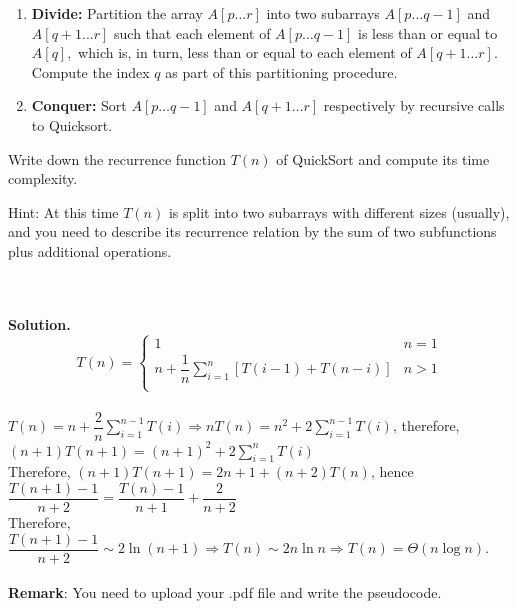 \documentclass{article}
\newtheorem*{solution}{Solution}
\renewenvironment{solution}[1][Solution]{~\\ \textbf{#1.}}{~\\}
\begin{document}
\begin{enumerate}
\begin{enumerate}
    	\item
    	\textbf{Divide:} Partition the array $A[p \ldots r]$ into two subarrays $A[p \ldots q-1]$ and $A[q+1 \ldots r]$ such that each element of $A[p \ldots q-1]$ is less than or equal to $A[q],$ which is, in turn, less than or equal to each element of $A[q+1 \ldots r].$ Compute the index $q$ as part of this partitioning procedure.
    	
    	\item
    	\textbf{Conquer:} Sort $A[p \ldots q-1]$ and $A[q+1 \ldots r]$ respectively by recursive calls to Quicksort.
    	
    \end{enumerate}
    Write down the recurrence function $T(n)$ of QuickSort and compute its time complexity.

    {\color{purple}Hint: At this time $T(n)$ is split into two subarrays with different sizes (usually), and you need to describe its recurrence relation by the sum of two subfunctions plus additional operations.}

~\\
\begin{solution}
\begin{equation*}
T(n)=\left\{
    \begin{array}{ll}
        1&n=1\\
        n+\dfrac{1}{n}\sum_{i=1}^n{\left[T(i-1)+T(n-i)\right]}&n>1\\
    \end{array}
\right.
\end{equation*}\\
$T(n)=n+\dfrac{2}{n}\sum_{i=1}^{n-1}T(i)\Rightarrow nT(n)=n^2+2\sum_{i=1}^{n-1}T(i)$, therefore, $(n+1)T(n+1)=(n+1)^2+2\sum_{i=1}^nT(i)$\\
Therefore, $(n+1)T(n+1)=2n+1+(n+2)T(n)$, hence $\dfrac{T(n+1)-1}{n+2}=\dfrac{T(n)-1}{n+1}+\dfrac{2}{n+2}$\\
Therefore, $\dfrac{T(n+1)-1}{n+2}\sim 2\ln(n+1)\Rightarrow T(n)\sim 2n\ln n\Rightarrow T(n)=\Theta(n\log n)$.
\end{solution}
~\\


\textbf{Remark}: You need to upload your .pdf file and write the pseudocode.
\end{enumerate}
\end{document}
